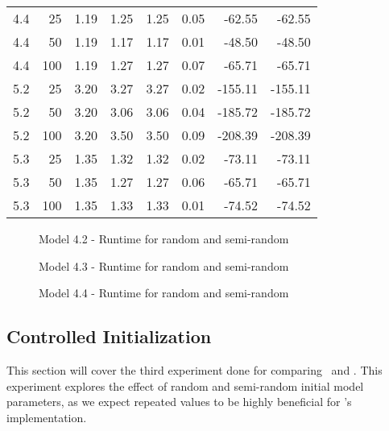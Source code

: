 \begin{table}
\begin{tabular}{rrrrrrrr}
        4.4           & 25  & 1.19 & 1.25     & 1.25      & 0.05   & -62.55     & -62.55    \\
        4.4           & 50  & 1.19 & 1.17     & 1.17      & 0.01   & -48.50     & -48.50    \\
        4.4           & 100 & 1.19 & 1.27     & 1.27      & 0.07   & -65.71     & -65.71    \\
        5.2           & 25  & 3.20 & 3.27     & 3.27      & 0.02   & -155.11    & -155.11   \\
        5.2           & 50  & 3.20 & 3.06     & 3.06      & 0.04   & -185.72    & -185.72   \\
        5.2           & 100 & 3.20 & 3.50     & 3.50      & 0.09   & -208.39    & -208.39   \\
        5.3           & 25  & 1.35 & 1.32     & 1.32      & 0.02   & -73.11     & -73.11    \\
        5.3           & 50  & 1.35 & 1.27     & 1.27      & 0.06   & -65.71     & -65.71    \\
        5.3           & 100 & 1.35 & 1.33     & 1.33      & 0.01   & -74.52     & -74.52    \\
        \bottomrule
    \end{tabular}
\end{table}


\begin{figure}
    
    \caption{Model 4.2 - Runtime for random and semi-random}
    \label{fig:semirandom-cupaal-jajapy-4-2}
\end{figure}

\begin{figure}
    
    \caption{Model 4.3 - Runtime for random and semi-random}
    \label{fig:semirandom-cupaal-jajapy-4-3}
\end{figure}

\begin{figure}
    
    \caption{Model 4.4 - Runtime for random and semi-random}
    \label{fig:semirandom-cupaal-jajapy-4-4}
\end{figure}

\subsection{Controlled Initialization}\label{subsec:controled_initialization}
This section will cover the third experiment done for comparing \Cupaal\ and \Jajapy.
This experiment explores the effect of random and semi-random initial model parameters, as we expect repeated values to be highly beneficial for \Cupaal's implementation.

